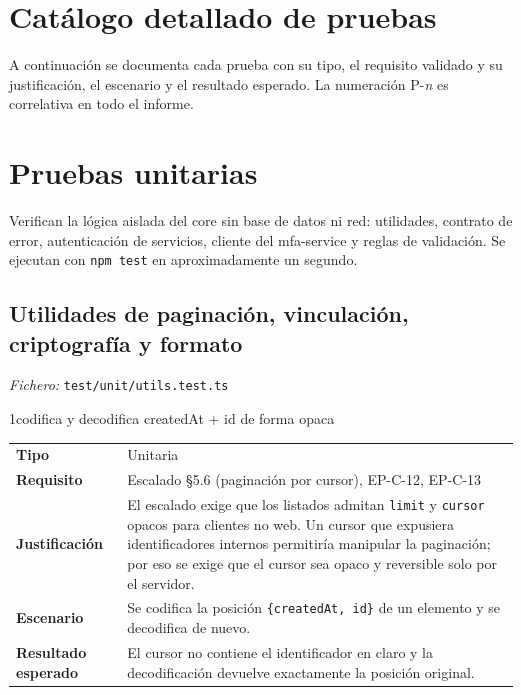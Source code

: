 \documentclass[11pt,a4paper]{report}
\begin{document}
\section*{Catálogo detallado de pruebas}
A continuación se documenta cada prueba con su tipo, el requisito validado y su justificación, el escenario y el resultado esperado. La numeración P-\emph{n} es correlativa en todo el informe.

\section{Pruebas unitarias}
Verifican la lógica aislada del core sin base de datos ni red: utilidades, contrato de error, autenticación de servicios, cliente del mfa-service y reglas de validación. Se ejecutan con \texttt{npm test} en aproximadamente un segundo.
\subsection{Utilidades de paginación, vinculación, criptografía y formato}
\noindent\textit{Fichero:} \texttt{test/unit/utils.test.ts}\par\medskip

\begin{pruebabox}{1}{codifica y decodifica createdAt + id de forma opaca}
\begin{tabularx}{\linewidth}{@{}>{\bfseries}p{2.9cm}X@{}}
Tipo & Unitaria \\
Requisito & Escalado \S{}5.6 (paginación por cursor), EP-C-12, EP-C-13 \\
Justificación & El escalado exige que los listados admitan \texttt{limit} y \texttt{cursor} opacos para clientes no web. Un cursor que expusiera identificadores internos permitiría manipular la paginación; por eso se exige que el cursor sea opaco y reversible solo por el servidor. \\
Escenario & Se codifica la posición \texttt{\{createdAt, id\}} de un elemento y se decodifica de nuevo. \\
Resultado esperado & El cursor no contiene el identificador en claro y la decodificación devuelve exactamente la posición original. \\
\end{tabularx}
\end{pruebabox}
\end{document}
